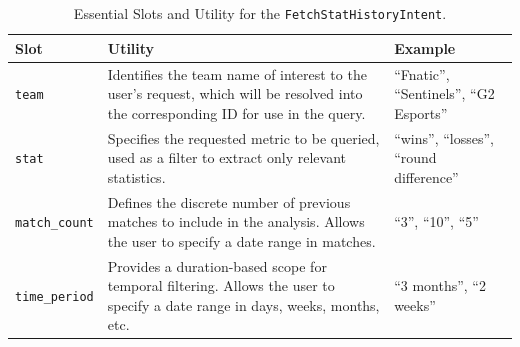 \begin{table}[htbp]
    \centering
    \small
    \begin{tabularx}{\linewidth}{@{} l >{\raggedright\arraybackslash}X >{\raggedright\arraybackslash}X @{}}
        \toprule
        \textbf{Slot} & \textbf{Utility} & \textbf{Example} \\ 
        \midrule
        
        \texttt{team} & 
        Identifies the team name of interest to the user's request, which will be resolved into the corresponding ID for use in the query. & 
        ``Fnatic'', ``Sentinels'', ``G2 Esports'' \\
        \addlinespace
        
        \midrule
        \texttt{stat} & 
        Specifies the requested metric to be queried, used as a filter to extract only relevant statistics. & 
        ``wins'', ``losses'', ``round difference'' \\
        \addlinespace
        
        \midrule
        \texttt{match\_count} & 
        Defines the discrete number of previous matches to include in the analysis. Allows the user to specify a date range in matches. & 
        ``3'', ``10'', ``5'' \\
        \addlinespace
        
        \midrule
        \texttt{time\_period} & 
        Provides a duration-based scope for temporal filtering. Allows the user to specify a date range in days, weeks, months, etc.& 
        ``3 months'', ``2 weeks'' \\
        \bottomrule
    \end{tabularx}
    \caption{Essential Slots and Utility for the \texttt{FetchStatHistoryIntent}.}
    \label{tab:HistoryIntentSlots}
\end{table}

